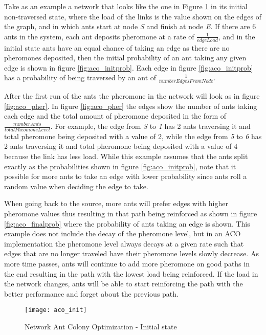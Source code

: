 Take as an example a network that looks like the one in Figure \ref{fig:aco_init} in its initial non-traversed state, where the load of the links is the value shown on the edges of the graph, and in which ants start at node \textit{S} and finish at node \textit{E}. If there are 6 ants in the system, each ant deposits pheromone at a rate of $\frac{1}{edgeLoad}$, and in the initial state ants have an equal chance of taking an edge as there are no pheromones deposited, then the initial probability of an ant taking any given edge is shown in figure \ref{fig:aco_initprob}. Each edge in figure \ref{fig:aco_initprob} has a probability of being traversed by an ant of $\frac{1}{numberEdgesFromNode}$.

After the first run of the ants the pheromone in the network will look as in figure \ref{fig:aco_pher}. In figure \ref{fig:aco_pher} the edges show the number of ants taking each edge and the total amount of pheromone deposited in the form of $\frac{numberAnts}{totalPheomoneLevel}$. For example, the edge from \textit{S} to \textit{1} has 2 ants traversing it and total pheromone being deposited with a value of 2, while the edge from \textit{5} to \textit{6} has 2 ants traversing it and total pheromone being deposited with a value of 4 because the link has less load. While this example assumes that the ants split exactly as the probabilities shown in figure \ref{fig:aco_initprob}, note that it possible for more ants to take an edge with lower probability since ants roll a random value when deciding the edge to take.

When going back to the source, more ants will prefer edges with higher pheromone values thus resulting in that path being reinforced as shown in figure \ref{fig:aco_finalprob} where the probability of ants taking an edge is shown. This example does not include the decay of the pheromone level, but in an ACO implementation the pheromone level always decays at a given rate such that edges that are no longer traveled have their pheromone levels slowly decrease. As more time passes, ants will continue to add more pheromone on good paths in the end resulting in the path with the lowest load being reinforced. If the load in the network changes, ants will be able to start reinforcing the path with the better performance and forget about the previous path.

\begin{figure}
	\centering
	\texttt{[image: aco\_init]}
	\caption{Network Ant Colony Optimization - Initial state}
	\label{fig:aco_init}
\end{figure}

